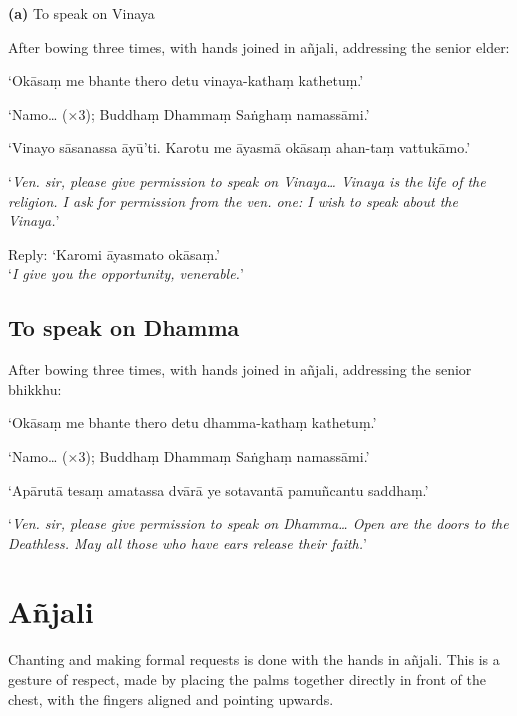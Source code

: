 \textbf{(a)} To speak on Vinaya

\begin{instruction}
  After bowing three times, with hands joined in añjali, addressing the senior
  elder:
\end{instruction}

‘Okāsaṃ me bhante thero detu vinaya-kathaṃ kathetuṃ.’

‘Namo… (×3); Buddhaṃ Dhammaṃ Saṅghaṃ namassāmi.’

‘Vinayo sāsanassa āyū'ti. Karotu me āyasmā okāsaṃ ahan-taṃ vattukāmo.’

‘\emph{Ven. sir, please give permission to speak on Vinaya… Vinaya is the life
  of the religion. I ask for permission from the ven. one: I wish to speak about
  the Vinaya.}’

Reply: ‘Karomi āyasmato okāsaṃ.’\\
‘\emph{I give you the opportunity, venerable.}’ 

\subsection{To speak on Dhamma}

\begin{instruction}
  After bowing three times, with hands joined in añjali, addressing the senior
  bhikkhu:
\end{instruction}

‘Okāsaṃ me bhante thero detu dhamma-kathaṃ kathetuṃ.’

‘Namo… (×3); Buddhaṃ Dhammaṃ Saṅghaṃ namassāmi.’

‘Apārutā tesaṃ amatassa dvārā ye sotavantā pamuñcantu saddhaṃ.’


‘\emph{Ven. sir, please give permission to speak on Dhamma… Open are the doors
  to the Deathless. May all those who have ears release their faith.}’

\section{Añjali}

Chanting and making formal requests is done with the hands in añjali.
This is a gesture of respect, made by placing the palms together
directly in front of the chest, with the fingers aligned and pointing
upwards.


